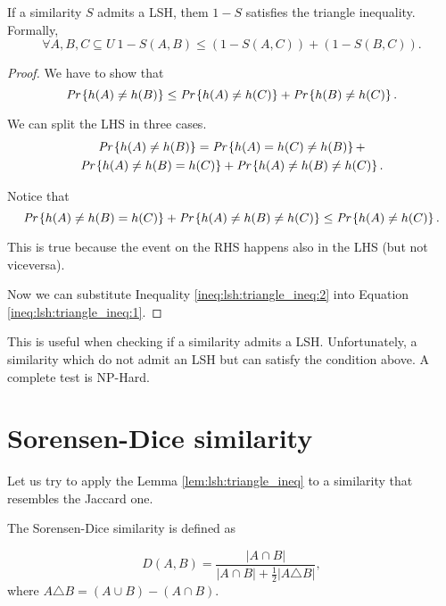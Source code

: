 \begin{lem}\label{lem:lsh:triangle_ineq}
	If a similarity $S$ admits a LSH, them $1-S$ satisfies the triangle inequality. Formally,
	\begin{equation}
		\forall A, B, C \subseteq U\ 1 - S(A, B) \leq (1 - S(A, C)) + (1 - S(B, C)).
	\end{equation}
\end{lem}
\begin{proof}
	We have to show that
	\begin{equation}
		\emph{Pr}\left\{h(A) \neq h(B)\right\} \leq \emph{Pr}\left\{h(A) \neq h(C)\right\} + \emph{Pr}\left\{h(B) \neq h(C)\right\}.
	\end{equation}
	
	We can split the LHS in three cases.
	\begin{multline} \label{ineq:lsh:triangle_ineq:1}
		\emph{Pr}\left\{h(A) \neq h(B)\right\} = \emph{Pr}\left\{h(A) = h(C) \neq h(B)\right\} + \\ \emph{Pr}\left\{h(A) \neq h(B) = h(C)\right\} + \emph{Pr}\left\{h(A) \neq h(B) \neq h(C)\right\}.
	\end{multline}
	
	Notice that
	\begin{equation}\label{ineq:lsh:triangle_ineq:2}
		\emph{Pr}\left\{h(A) \neq h(B) = h(C)\right\} + \emph{Pr}\left\{h(A) \neq h(B) \neq h(C)\right\} \leq \emph{Pr}\left\{h(A) \neq h(C)\right\}.
	\end{equation}

		This is true because the event on the RHS happens also in the LHS (but not viceversa). 
		
		Now we can substitute Inequality \ref{ineq:lsh:triangle_ineq:2} into Equation \ref{ineq:lsh:triangle_ineq:1}.
\end{proof}

This is useful when checking if a similarity admits a LSH. Unfortunately, a similarity which do not admit an LSH but can satisfy the condition above. A complete test is NP-Hard.
\section{Sorensen-Dice similarity}

Let us try to apply the Lemma \ref{lem:lsh:triangle_ineq} to a similarity that resembles the Jaccard one. 
\begin{defn}
	The Sorensen-Dice similarity is defined as
	
	\begin{equation}
	D(A, B) = \frac{|A \cap B|}{|A \cap B| + \frac{1}{2}|A \triangle B|},
	\end{equation}
	where $A\triangle B = (A \cup B) -  (A \cap B)$.
\end{defn}

